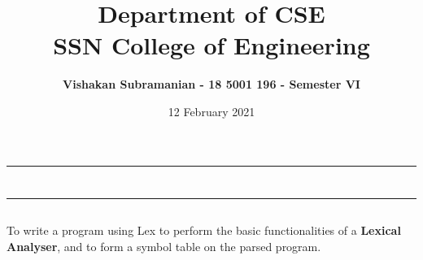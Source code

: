 \documentclass[12pt, a4]{article}
\title{\textbf{Department of CSE\\SSN College of Engineering}}
\author{\textbf{Vishakan Subramanian - 18 5001 196 - Semester VI}}
\date{12 February 2021}
\begin{document}
\maketitle
\hrule
\section*{}
\hrule
\bigskip

\subsection*{}
\subsection*{}
\begin{flushleft}
To write a program using Lex to perform the
basic functionalities of a \textbf{Lexical Analyser}, and to form a symbol table on the parsed program.
\end{flushleft}

\newpage
\subsection*{}
\begin{flushleft}

\end{flushleft}

\newpage
\subsection*{}
\begin{flushleft}

\end{flushleft}

\newpage
\end{document}
